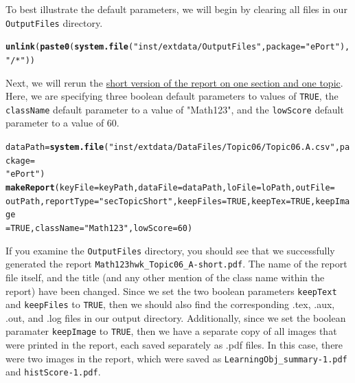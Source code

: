 \documentclass{article}\usepackage[]{graphicx}\usepackage[]{color}
\makeatletter
\newcommand{\hlnum}[1]{\textcolor[rgb]{0.686,0.059,0.569}{#1}}%
\newcommand{\hlstr}[1]{\textcolor[rgb]{0.192,0.494,0.8}{#1}}%
\newcommand{\hlstd}[1]{\textcolor[rgb]{0.345,0.345,0.345}{#1}}%
\newcommand{\hlkwb}[1]{\textcolor[rgb]{0.69,0.353,0.396}{#1}}%
\newcommand{\hlkwc}[1]{\textcolor[rgb]{0.333,0.667,0.333}{#1}}%
\newcommand{\hlkwd}[1]{\textcolor[rgb]{0.737,0.353,0.396}{\textbf{#1}}}%
\newenvironment{kframe}{%
 \def\at@end@of@kframe{}%
 \ifinner\ifhmode%
  \def\at@end@of@kframe{\end{minipage}}%
  \begin{minipage}{\columnwidth}%
 \fi\fi%
 \def\FrameCommand##1{\hskip\@totalleftmargin \hskip-\fboxsep
 \colorbox{shadecolor}{##1}\hskip-\fboxsep
     \hskip-\linewidth \hskip-\@totalleftmargin \hskip\columnwidth}%
 \MakeFramed {\advance\hsize-\width
   \@totalleftmargin\z@ \linewidth\hsize
   \@setminipage}}%
 {\par\unskip\endMakeFramed%
 \at@end@of@kframe}
\newenvironment{knitrout}{}{} %
\numberwithin{equation}{section} %
\makeatother
\begin{document}
To best illustrate the default parameters, we will begin by clearing all files in our \texttt{OutputFiles} directory.

\begin{knitrout}
\color{fgcolor}\begin{kframe}
\begin{alltt}
\hlkwd{unlink}\hlstd{(}\hlkwd{paste0}\hlstd{(}\hlkwd{system.file}\hlstd{(}\hlstr{"inst/extdata/OutputFiles"}\hlstd{,} \hlkwc{package} \hlstd{=} \hlstr{"ePort"}\hlstd{),} \hlstr{"/*"}\hlstd{))}
\end{alltt}
\end{kframe}
\end{knitrout}

Next, we will rerun the \hyperref[sec:oneTopicSectionShort]{short version of the report on one section and one topic}. Here, we are specifying three boolean default parameters to values of \texttt{TRUE}, the \texttt{className} default parameter to a value of "Math123", and the \texttt{lowScore} default parameter to a value of 60.

\begin{knitrout}
\color{fgcolor}\begin{kframe}
\begin{alltt}
\hlstd{dataPath} \hlkwb{=} \hlkwd{system.file}\hlstd{(}\hlstr{"inst/extdata/DataFiles/Topic06/Topic06.A.csv"}\hlstd{,} \hlkwc{package} \hlstd{=}
  \hlstr{"ePort"}\hlstd{)}
\hlkwd{makeReport}\hlstd{(}\hlkwc{keyFile} \hlstd{= keyPath,} \hlkwc{dataFile} \hlstd{= dataPath,} \hlkwc{loFile} \hlstd{= loPath,} \hlkwc{outFile} \hlstd{=}
  \hlstd{outPath,} \hlkwc{reportType} \hlstd{=} \hlstr{"secTopicShort"}\hlstd{,} \hlkwc{keepFiles} \hlstd{=} \hlnum{TRUE}\hlstd{,} \hlkwc{keepTex} \hlstd{=} \hlnum{TRUE}\hlstd{,} \hlkwc{keepImage}
  \hlstd{=} \hlnum{TRUE}\hlstd{,} \hlkwc{className} \hlstd{=} \hlstr{"Math123"}\hlstd{,} \hlkwc{lowScore} \hlstd{=} \hlnum{60}\hlstd{)}
\end{alltt}
\end{kframe}
\end{knitrout}

If you examine the \texttt{OutputFiles} directory, you should see that we successfully generated the report \texttt{Math123hwk\_Topic06\_A-short.pdf}. The name of the report file itself, and the title (and any other mention of the class name within the report) have been changed. Since we set the two boolean parameters \texttt{keepText} and \texttt{keepFiles} to \texttt{TRUE}, then we should also find the corresponding .tex, .aux, .out, and .log files in our output directory. Additionally, since we set the boolean paramater \texttt{keepImage} to \texttt{TRUE}, then we have a separate copy of all images that were printed in the report, each saved separately as .pdf files. In this case, there were two images in the report, which were saved as \texttt{LearningObj\_summary-1.pdf} and \texttt{histScore-1.pdf}.\\
\end{document}
